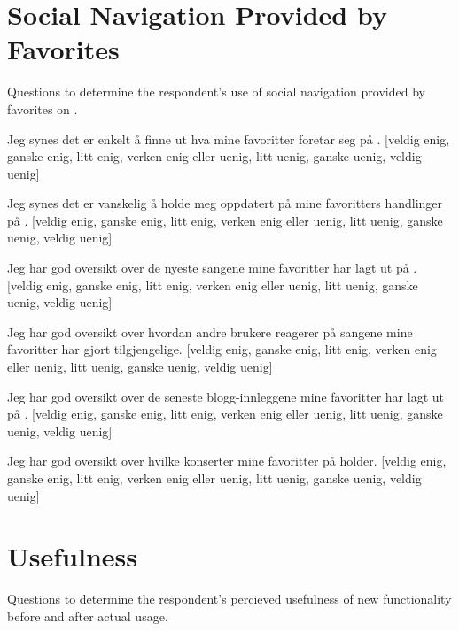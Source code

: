 \section{Social Navigation Provided by Favorites}

Questions to determine the respondent's use of
social navigation provided by favorites on \urort{}.

\begin{items}
  \item Jeg synes det er enkelt å finne ut hva mine favoritter
    foretar seg på \urort{}.
    [veldig enig, ganske enig, litt enig,
    verken enig eller uenig,
    litt uenig, ganske uenig, veldig uenig]
  \item Jeg synes det er vanskelig å holde meg oppdatert på mine
    favoritters handlinger på \urort{}.
    [veldig enig, ganske enig, litt enig,
    verken enig eller uenig,
    litt uenig, ganske uenig, veldig uenig]
  \item Jeg har god oversikt over de nyeste sangene mine favoritter
    har lagt ut på \urort{}.
    [veldig enig, ganske enig, litt enig,
    verken enig eller uenig,
    litt uenig, ganske uenig, veldig uenig]
  \item Jeg har god oversikt over hvordan andre \urort{} brukere reagerer på
    sangene mine favoritter har gjort tilgjengelige.
    [veldig enig, ganske enig, litt enig,
    verken enig eller uenig,
    litt uenig, ganske uenig, veldig uenig]
  \item Jeg har god oversikt over de seneste blogg-innleggene
    mine favoritter har lagt ut på \urort{}.
    [veldig enig, ganske enig, litt enig,
    verken enig eller uenig,
    litt uenig, ganske uenig, veldig uenig]
  \item Jeg har god oversikt over hvilke konserter mine favoritter
    på \urort{} holder.
    [veldig enig, ganske enig, litt enig,
    verken enig eller uenig,
    litt uenig, ganske uenig, veldig uenig]
\end{items}

\section{Usefulness}

Questions to determine the respondent's percieved usefulness of new
functionality before and after actual usage.

